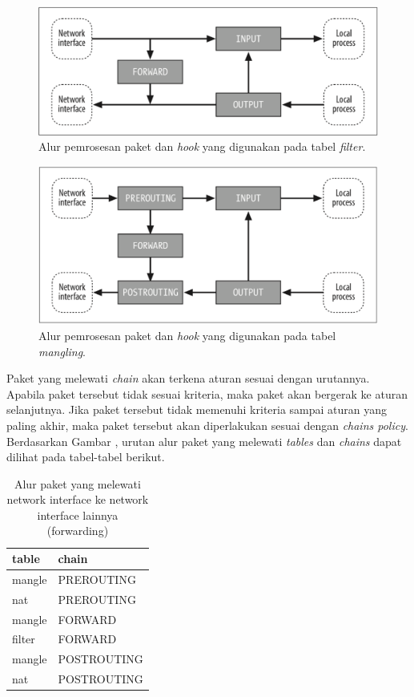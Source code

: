 \begin{figure}[H]
	\centering
	\includegraphics[width=\textwidth]{resources/filter_table.png}
	\caption{Alur pemrosesan paket dan \textit{hook} yang digunakan pada tabel \textit{filter}.}
	\label{fig:packetflow_filter}
\end{figure}

\begin{figure}[H]
	\centering
	\includegraphics[width=\textwidth]{resources/mangling_table.png}
	\caption{Alur pemrosesan paket dan \textit{hook} yang digunakan pada tabel \textit{mangling}.}
	\label{fig:packetflow_mangling}
\end{figure}

Paket yang melewati \textit{chain} akan terkena aturan sesuai dengan urutannya. Apabila paket tersebut tidak sesuai kriteria, maka paket akan bergerak ke aturan selanjutnya. Jika paket tersebut tidak memenuhi kriteria sampai aturan yang paling akhir, maka paket tersebut akan diperlakukan sesuai dengan \textit{chain\textquotesingle s policy}. 
Berdasarkan Gambar , urutan alur paket yang melewati \textit{tables} dan \textit{chains} dapat dilihat pada tabel-tabel berikut.

\begin{table}[H]
	\caption{Alur paket yang melewati network interface ke network interface lainnya (forwarding)}
	\label{table:network_to_network}
	\centering
	\begin{tabular}{ll}
		\hline
		\rowcolor[HTML]{C0C0C0} 
		table  & chain       \\ \hline
		mangle & PREROUTING  \\
		nat    & PREROUTING  \\
		mangle & FORWARD     \\
		filter & FORWARD     \\
		mangle & POSTROUTING \\
		nat    & POSTROUTING \\ \hline
	\end{tabular}
\end{table}


